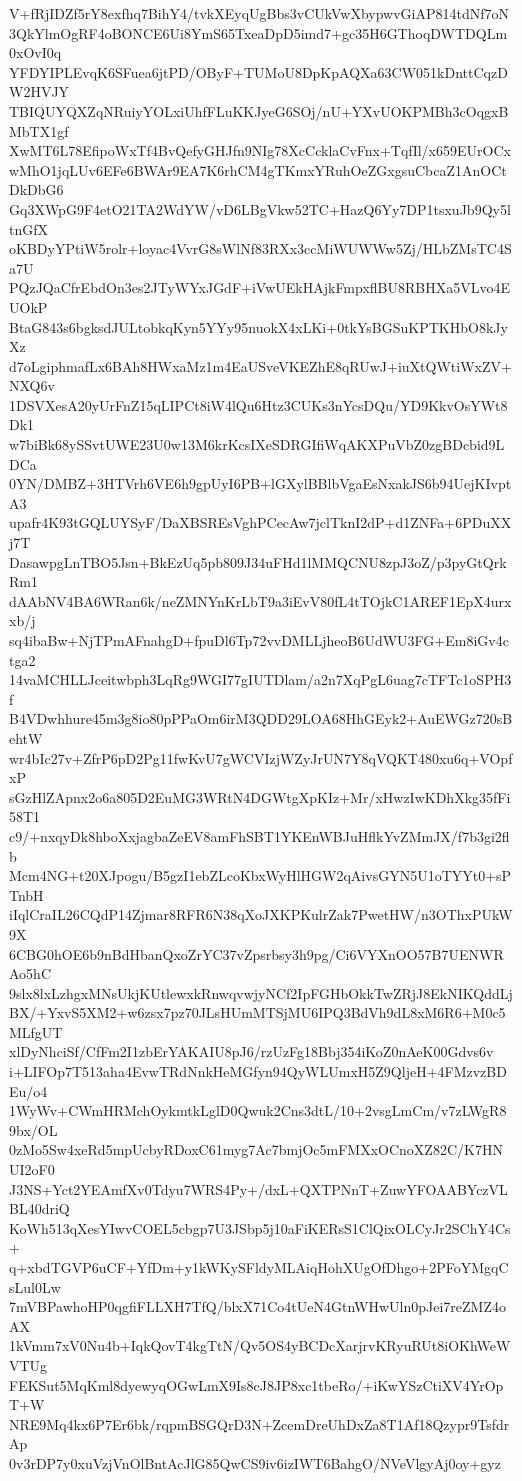 V+fRjIDZf5rY8exfhq7BihY4/tvkXEyqUgBbs3vCUkVwXbypwvGiAP814tdNf7oN
3QkYlmOgRF4oBONCE6Ui8YmS65TxeaDpD5imd7+gc35H6GThoqDWTDQLm0xOvI0q
YFDYIPLEvqK6SFuea6jtPD/OByF+TUMoU8DpKpAQXa63CW051kDnttCqzDW2HVJY
TBIQUYQXZqNRuiyYOLxiUhfFLuKKJyeG6SOj/nU+YXvUOKPMBh3cOqgxBMbTX1gf
XwMT6L78EfipoWxTf4BvQefyGHJfn9NIg78XcCcklaCvFnx+TqfIl/x659EUrOCx
wMhO1jqLUv6EFe6BWAr9EA7K6rhCM4gTKmxYRuhOeZGxgsuCbcaZ1AnOCtDkDbG6
Gq3XWpG9F4etO21TA2WdYW/vD6LBgVkw52TC+HazQ6Yy7DP1tsxuJb9Qy5ltnGfX
oKBDyYPtiW5rolr+loyac4VvrG8sWlNf83RXx3ccMiWUWWw5Zj/HLbZMsTC4Sa7U
PQzJQaCfrEbdOn3es2JTyWYxJGdF+iVwUEkHAjkFmpxflBU8RBHXa5VLvo4EUOkP
BtaG843s6bgksdJULtobkqKyn5YYy95nuokX4xLKi+0tkYsBGSuKPTKHbO8kJyXz
d7oLgiphmafLx6BAh8HWxaMz1m4EaUSveVKEZhE8qRUwJ+iuXtQWtiWxZV+NXQ6v
1DSVXesA20yUrFnZ15qLIPCt8iW4lQu6Htz3CUKs3nYcsDQu/YD9KkvOsYWt8Dk1
w7biBk68ySSvtUWE23U0w13M6krKcsIXeSDRGIfiWqAKXPuVbZ0zgBDcbid9LDCa
0YN/DMBZ+3HTVrh6VE6h9gpUyI6PB+lGXylBBlbVgaEsNxakJS6b94UejKIvptA3
upafr4K93tGQLUYSyF/DaXBSREsVghPCecAw7jclTknI2dP+d1ZNFa+6PDuXXj7T
DasawpgLnTBO5Jsn+BkEzUq5pb809J34uFHd1lMMQCNU8zpJ3oZ/p3pyGtQrkRm1
dAAbNV4BA6WRan6k/neZMNYnKrLbT9a3iEvV80fL4tTOjkC1AREF1EpX4urxxb/j
sq4ibaBw+NjTPmAFnahgD+fpuDl6Tp72vvDMLLjheoB6UdWU3FG+Em8iGv4ctga2
14vaMCHLLJceitwbph3LqRg9WGI77gIUTDlam/a2n7XqPgL6uag7cTFTc1oSPH3f
B4VDwhhure45m3g8io80pPPaOm6irM3QDD29LOA68HhGEyk2+AuEWGz720sBehtW
wr4bIc27v+ZfrP6pD2Pg11fwKvU7gWCVIzjWZyJrUN7Y8qVQKT480xu6q+VOpfxP
sGzHlZApnx2o6a805D2EuMG3WRtN4DGWtgXpKIz+Mr/xHwzIwKDhXkg35fFi58T1
c9/+nxqyDk8hboXxjagbaZeEV8amFhSBT1YKEnWBJuHflkYvZMmJX/f7b3gi2flb
Mcm4NG+t20XJpogu/B5gzI1ebZLcoKbxWyHlHGW2qAivsGYN5U1oTYYt0+sPTnbH
iIqlCraIL26CQdP14Zjmar8RFR6N38qXoJXKPKulrZak7PwetHW/n3OThxPUkW9X
6CBG0hOE6b9nBdHbanQxoZrYC37vZpsrbsy3h9pg/Ci6VYXnOO57B7UENWRAo5hC
9slx8lxLzhgxMNsUkjKUtlewxkRnwqvwjyNCf2IpFGHbOkkTwZRjJ8EkNIKQddLj
BX/+YxvS5XM2+w6zsx7pz70JLsHUmMTSjMU6IPQ3BdVh9dL8xM6R6+M0c5MLfgUT
xlDyNhciSf/CfFm2I1zbErYAKAIU8pJ6/rzUzFg18Bbj354iKoZ0nAeK00Gdvs6v
i+LIFOp7T513aha4EvwTRdNnkHeMGfyn94QyWLUmxH5Z9QljeH+4FMzvzBDEu/o4
1WyWv+CWmHRMchOykmtkLglD0Qwuk2Cns3dtL/10+2vsgLmCm/v7zLWgR89bx/OL
0zMo5Sw4xeRd5mpUcbyRDoxC61myg7Ac7bmjOc5mFMXxOCnoXZ82C/K7HNUI2oF0
J3NS+Yct2YEAmfXv0Tdyu7WRS4Py+/dxL+QXTPNnT+ZuwYFOAABYczVLBL40driQ
KoWh513qXesYIwvCOEL5cbgp7U3JSbp5j10aFiKERsS1ClQixOLCyJr2SChY4Cs+
q+xbdTGVP6uCF+YfDm+y1kWKySFldyMLAiqHohXUgOfDhgo+2PFoYMgqCsLul0Lw
7mVBPawhoHP0qgfiFLLXH7TfQ/blxX71Co4tUeN4GtnWHwUln0pJei7reZMZ4oAX
1kVmm7xV0Nu4b+IqkQovT4kgTtN/Qv5OS4yBCDcXarjrvKRyuRUt8iOKhWeWVTUg
FEKSut5MqKml8dyewyqOGwLmX9Is8cJ8JP8xc1tbeRo/+iKwYSzCtiXV4YrOpT+W
NRE9Mq4kx6P7Er6bk/rqpmBSGQrD3N+ZcemDreUhDxZa8T1Af18Qzypr9TsfdrAp
0v3rDP7y0xuVzjVnOlBntAcJlG85QwCS9iv6izIWT6BahgO/NVeVlgyAj0oy+gyz
